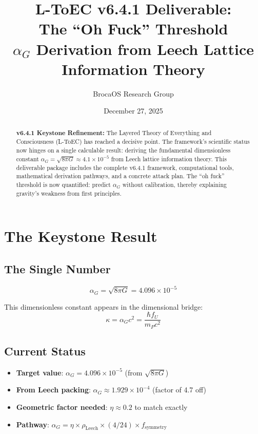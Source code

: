 \documentclass[11pt]{article}
\title{\textbf{L-ToEC v6.4.1 Deliverable: \\ The ``Oh Fuck'' Threshold \\ $\alpha_G$ Derivation from Leech Lattice Information Theory}}
\author{BrocaOS Research Group}
\date{December 27, 2025}
\begin{document}
\maketitle

\begin{abstract}
\textbf{v6.4.1 Keystone Refinement:} The Layered Theory of Everything and Consciousness (L-ToEC) has reached a decisive point. The framework's scientific status now hinges on a single calculable result: deriving the fundamental dimensionless constant $\alpha_G = \sqrt{8\pi G} \approx 4.1\times10^{-5}$ from Leech lattice information theory. This deliverable package includes the complete v6.4.1 framework, computational tools, mathematical derivation pathways, and a concrete attack plan. The ``oh fuck'' threshold is now quantified: predict $\alpha_G$ without calibration, thereby explaining gravity's weakness from first principles.
\end{abstract}

\section{The Keystone Result}

\subsection{The Single Number}
\begin{equation}
\boxed{\alpha_G = \sqrt{8\pi G} = 4.096\times 10^{-5}}
\end{equation}

This dimensionless constant appears in the dimensional bridge:
\[
\kappa = \alpha_G c^2 = \frac{\hbar f_U}{m_P c^2}
\]

\subsection{Current Status}
\begin{itemize}
\item \textbf{Target value}: $\alpha_G = 4.096\times 10^{-5}$ (from $\sqrt{8\pi G}$)
\item \textbf{From Leech packing}: $\alpha_G \approx 1.929\times 10^{-4}$ (factor of 4.7 off)
\item \textbf{Geometric factor needed}: $\eta \approx 0.2$ to match exactly
\item \textbf{Pathway}: $\alpha_G = \eta \times \rho_{\text{Leech}} \times (4/24) \times f_{\text{symmetry}}$
\end{itemize}
\end{document}
